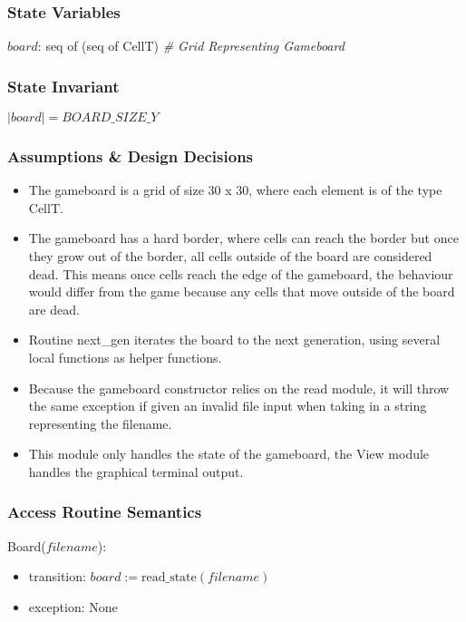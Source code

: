\documentclass[12pt]{article}
\begin{document}
\subsubsection* {State Variables}

$board$: seq of (seq of CellT) \textit{\# Grid Representing Gameboard}

\subsubsection* {State Invariant}

$|board| = BOARD\_SIZE\_Y$

\subsubsection* {Assumptions \& Design Decisions}

\begin{itemize}

\item The gameboard is a grid of size 30 x 30, where each element is of the type CellT.

\item The gameboard has a hard border, where cells can reach the border but once they grow out of the border, all cells outside of the board are considered dead. This means once cells reach the edge of the gameboard, the behaviour would differ from the game because any cells that move outside of the board are dead.

\item Routine next\_gen iterates the board to the next generation, using several local functions as helper functions.

\item Because the gameboard constructor relies on the read module, it will throw the same exception if given an invalid file input when taking in a string representing the filename.

\item This module only handles the state of the gameboard, the View module handles the graphical terminal output.

\end{itemize}

\subsubsection* {Access Routine Semantics}

\noindent Board($filename$):
\begin{itemize}
\item transition: 
$board := \text{read\_state}(filename)$
\item exception: None
\end{itemize}
\end{document}
